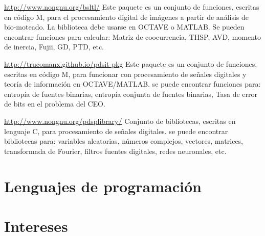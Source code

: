 \documentclass[11pt,a4paper,sans]{moderncv} %
\begin{document}
			{\url{http://www.nongnu.org/bsltl/}}
			{}{}
			{Este paquete es un conjunto de funciones, escritas en código M, para el
 procesamiento digital de imágenes a partir de análisis de bio-moteado.
 La biblioteca debe usarse en OCTAVE o MATLAB.
 Se pueden encontrar funciones para calcular:
 Matriz de coocurrencia, THSP, AVD, momento de inercia,
 Fujii, GD, PTD, etc.}

			{\url{http://trucomanx.github.io/pdsit-pkg}}
			{}{}
			{Este paquete es un conjunto de funciones, escritas en código M, para funcionar
 con procesamiento de señales digitales y teoría de
 información en OCTAVE/MATLAB. se puede encontrar
 funciones para: entropía de fuentes binarias,
 entropía conjunta de fuentes binarias,
 Tasa de error de bits en el problema del CEO. }
			
			

			{\url{http://www.nongnu.org/pdsplibrary/}}
			{}{}
			{Conjunto de bibliotecas, escritas en lenguaje C, para
 procesamiento de señales digitales. se puede encontrar
 bibliotecas para: variables aleatorias, números complejos,
 vectores, matrices, transformada de Fourier, filtros
 fuentes digitales, redes neuronales, etc.}


\section{Lenguajes de programación}




\section{Intereses}

\renewcommand{\listitemsymbol}{-~} %
\end{document}
